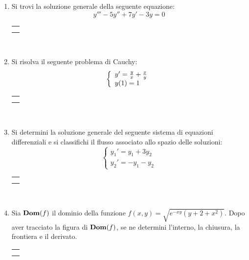 \documentclass[12pt,a4paper]{report}\pagenumbering{roman}
\begin{document}
\begin{enumerate}
\item Si trovi la soluzione generale della seguente equazione:
$$y'''-5y''+7y'-3y=0$$
\hspace*{-3.5cm}\begin{tabular}{c}\hline\\\hspace*{16cm}\end{tabular}\\
\hspace*{-3.5cm}{\bf SVOLGIMENTO:}\pagebreak

\item Si risolva il seguente problema di Cauchy:
$$\left\{\begin{array}{l} y'={y\over x}+{x\over y} \\ y(1)=1
\end{array}\right.$$
\hspace*{-3.5cm}\begin{tabular}{c}\hline\\\hspace*{16cm}\end{tabular}\\
\hspace*{-3.5cm}{\bf SVOLGIMENTO:}\pagebreak

\item Si determini la soluzione generale del seguente sistema di 
equazioni differenziali e si classifichi il flusso associato allo spazio 
delle soluzioni:
$$\left\{\begin{array}{l}y_1'=y_1+3y_2\\ y_2'=-y_1-y_2\end{array}\right.$$
\hspace*{-3.5cm}\begin{tabular}{c}\hline\\\hspace*{16cm}\end{tabular}\\
\hspace*{-3.5cm}{\bf SVOLGIMENTO:}\pagebreak

\item Sia ${\bf Dom}(f)$ il dominio della funzione $f(x,y)=\sqrt{e^{-xy}
(y+2+x^2)}$. Dopo aver tracciato la figura di ${\bf Dom}(f)$, se ne determini
l'interno, la chiusura, la frontiera e il derivato.\\
\hspace*{-3.5cm}\begin{tabular}{c}\hline\\\hspace*{16cm}\end{tabular}\\
\hspace*{-3.5cm}{\bf SVOLGIMENTO:}\pagebreak


\end{enumerate}
\end{document}
